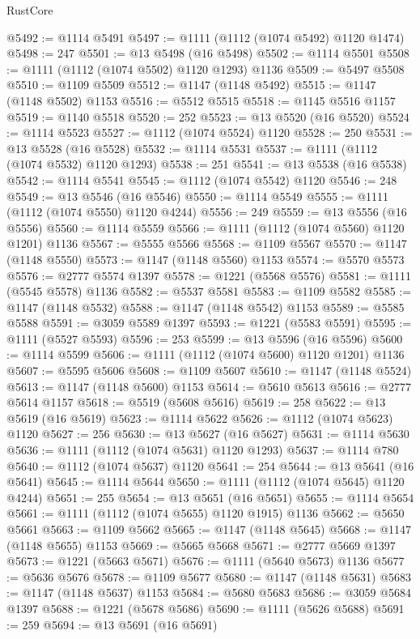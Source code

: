 \begin{lexlean}{RustCore}
\begin{coremodule}
@5492 := @1114 @5491
@5497 := @1111 (@1112 (@1074 @5492) @1120 @1474)
@5498 := 247
@5501 := @13 @5498 (@16 @5498)
@5502 := @1114 @5501
@5508 := @1111 (@1112 (@1074 @5502) @1120 @1293) @1136
@5509 := @5497 @5508
@5510 := @1109 @5509
@5512 := @1147 (@1148 @5492)
@5515 := @1147 (@1148 @5502) @1153
@5516 := @5512 @5515
@5518 := @1145 @5516 @1157
@5519 := @1140 @5518
@5520 := 252
@5523 := @13 @5520 (@16 @5520)
@5524 := @1114 @5523
@5527 := @1112 (@1074 @5524) @1120
@5528 := 250
@5531 := @13 @5528 (@16 @5528)
@5532 := @1114 @5531
@5537 := @1111 (@1112 (@1074 @5532) @1120 @1293)
@5538 := 251
@5541 := @13 @5538 (@16 @5538)
@5542 := @1114 @5541
@5545 := @1112 (@1074 @5542) @1120
@5546 := 248
@5549 := @13 @5546 (@16 @5546)
@5550 := @1114 @5549
@5555 := @1111 (@1112 (@1074 @5550) @1120 @4244)
@5556 := 249
@5559 := @13 @5556 (@16 @5556)
@5560 := @1114 @5559
@5566 := @1111 (@1112 (@1074 @5560) @1120 @1201) @1136
@5567 := @5555 @5566
@5568 := @1109 @5567
@5570 := @1147 (@1148 @5550)
@5573 := @1147 (@1148 @5560) @1153
@5574 := @5570 @5573
@5576 := @2777 @5574 @1397
@5578 := @1221 (@5568 @5576)
@5581 := @1111 (@5545 @5578) @1136
@5582 := @5537 @5581
@5583 := @1109 @5582
@5585 := @1147 (@1148 @5532)
@5588 := @1147 (@1148 @5542) @1153
@5589 := @5585 @5588
@5591 := @3059 @5589 @1397
@5593 := @1221 (@5583 @5591)
@5595 := @1111 (@5527 @5593)
@5596 := 253
@5599 := @13 @5596 (@16 @5596)
@5600 := @1114 @5599
@5606 := @1111 (@1112 (@1074 @5600) @1120 @1201) @1136
@5607 := @5595 @5606
@5608 := @1109 @5607
@5610 := @1147 (@1148 @5524)
@5613 := @1147 (@1148 @5600) @1153
@5614 := @5610 @5613
@5616 := @2777 @5614 @1157
@5618 := @5519 (@5608 @5616)
@5619 := 258
@5622 := @13 @5619 (@16 @5619)
@5623 := @1114 @5622
@5626 := @1112 (@1074 @5623) @1120
@5627 := 256
@5630 := @13 @5627 (@16 @5627)
@5631 := @1114 @5630
@5636 := @1111 (@1112 (@1074 @5631) @1120 @1293)
@5637 := @1114 @780
@5640 := @1112 (@1074 @5637) @1120
@5641 := 254
@5644 := @13 @5641 (@16 @5641)
@5645 := @1114 @5644
@5650 := @1111 (@1112 (@1074 @5645) @1120 @4244)
@5651 := 255
@5654 := @13 @5651 (@16 @5651)
@5655 := @1114 @5654
@5661 := @1111 (@1112 (@1074 @5655) @1120 @1915) @1136
@5662 := @5650 @5661
@5663 := @1109 @5662
@5665 := @1147 (@1148 @5645)
@5668 := @1147 (@1148 @5655) @1153
@5669 := @5665 @5668
@5671 := @2777 @5669 @1397
@5673 := @1221 (@5663 @5671)
@5676 := @1111 (@5640 @5673) @1136
@5677 := @5636 @5676
@5678 := @1109 @5677
@5680 := @1147 (@1148 @5631)
@5683 := @1147 (@1148 @5637) @1153
@5684 := @5680 @5683
@5686 := @3059 @5684 @1397
@5688 := @1221 (@5678 @5686)
@5690 := @1111 (@5626 @5688)
@5691 := 259
@5694 := @13 @5691 (@16 @5691)

\end{coremodule}
\end{lexlean}
